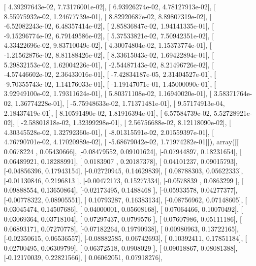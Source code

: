 \documentclass{article}
\begin{document}
       [  4.39297643e-02,   7.73176001e-02],
       [  6.93926274e-02,   4.78127913e-02],
       [  8.55975932e-02,   1.24677739e-01],
       [  8.82920687e-02,   8.89807319e-02],
       [ -6.52082243e-02,   6.48357414e-02],
       [  2.85836847e-02,   1.94141335e-01],
       [ -9.15296774e-02,   6.79149586e-02],
       [  5.37533821e-02,   7.50942351e-02],
       [  4.33422696e-02,   9.83710049e-02],
       [  4.30074804e-02,   1.15373774e-01],
       [ -1.21562876e-02,   8.81188426e-02],
       [  8.33615043e-02,   1.69422894e-01],
       [  5.29832153e-02,   1.62004226e-01],
       [ -2.54487143e-02,   8.21496726e-02],
       [ -4.57446602e-02,   2.36433016e-01],
       [ -7.42834187e-05,   2.31404527e-01],
       [ -9.70355743e-02,   1.14176033e-01],
       [ -1.19147071e-01,   1.45000090e-01],
       [  3.92949100e-02,   1.79311624e-01],
       [  5.80371108e-02,   1.16940020e-01],
       [  3.58371764e-02,   1.36774228e-01],
       [ -5.75948633e-02,   1.71371481e-01],
       [  9.57174913e-04,   2.18437419e-01],
       [  8.10591490e-02,   1.81916394e-01],
       [  6.57584739e-02,   5.52728921e-02],
       [ -2.58801818e-02,   1.32399298e-01],
       [  2.56756688e-02,   8.12118090e-02],
       [  4.30345528e-02,   1.32792360e-01],
       [ -8.01315591e-02,   2.01559397e-01],
       [  4.76790701e-02,   4.17020989e-02],
       [ -5.68679042e-02,   1.71974282e-01]]), array([[ 0.0678224 ,  0.05430666],
       [-0.08479552,  0.09101624],
       [-0.07944897,  0.18231654],
       [ 0.06489921,  0.18288991],
       [ 0.0183907 ,  0.20187378],
       [ 0.04101237,  0.09015793],
       [-0.04856396,  0.17943154],
       [-0.02720945,  0.14629839],
       [ 0.08788303,  0.05622333],
       [-0.01130846,  0.2196813 ],
       [-0.00472173,  0.15277334],
       [-0.0578839 ,  0.0863299 ],
       [ 0.09888554,  0.13650864],
       [-0.02173495,  0.1488468 ],
       [-0.05933578,  0.04277377],
       [-0.00778322,  0.08905551],
       [ 0.10793287,  0.16383134],
       [-0.08756962,  0.07148605],
       [ 0.03045474,  0.14507686],
       [ 0.04000001,  0.05608168],
       [ 0.07064466,  0.10070492],
       [ 0.03069364,  0.03718104],
       [ 0.07297437,  0.0799576 ],
       [ 0.07607986,  0.05111186],
       [ 0.06893171,  0.07270778],
       [-0.07182264,  0.19790938],
       [ 0.00980963,  0.13722165],
       [-0.02350615,  0.06536557],
       [-0.08882585,  0.06742693],
       [ 0.10392411,  0.17851184],
       [ 0.02700495,  0.06309799],
       [-0.06372518,  0.0908029 ],
       [-0.09018867,  0.08081388],
       [-0.12170039,  0.22821566],
       [ 0.06062051,  0.07918276],
\end{document}
